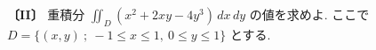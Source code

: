 \noindent\textbf{〔II〕}
重積分 $\displaystyle\iint_D (x^2+2xy-4y^3)\,dx\,dy$ の値を求めよ.
ここで $D=\{(x,y)\ ;\ -1\le x\le 1,\ 0\le y\le 1\}$ とする.

